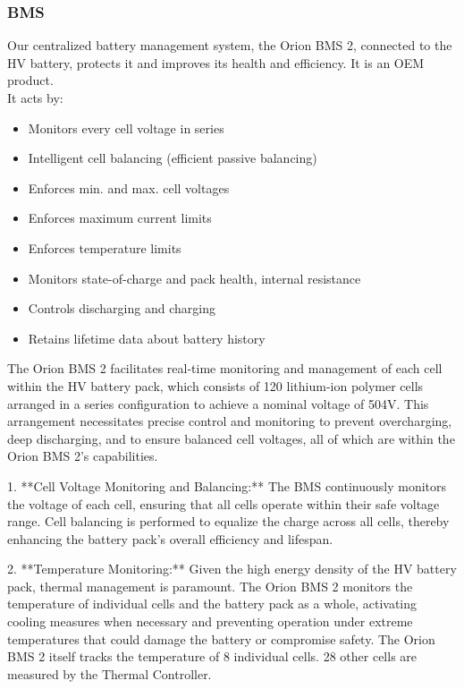 \subsubsection{BMS}
Our centralized battery management system, the Orion BMS 2, connected to the HV battery, protects it and improves its health and efficiency.
It is an OEM product. \\
It acts by: \begin{itemize}
    \item Monitors every cell voltage in series
    \item Intelligent cell balancing (efficient passive
    balancing)
    \item Enforces min. and max. cell voltages
    \item Enforces maximum current limits
    \item Enforces temperature limits
    \item Monitors state-of-charge and pack health, internal resistance
    \item Controls discharging and charging
    \item Retains lifetime data about battery history
\end{itemize}

The Orion BMS 2 facilitates real-time monitoring and management of each cell within the HV battery pack, 
which consists of 120 lithium-ion polymer cells arranged in a series configuration to achieve a nominal voltage of 504V. 
This arrangement necessitates precise control and monitoring to prevent overcharging, deep discharging, and to ensure balanced 
cell voltages, all of which are within the Orion BMS 2's capabilities.

1. **Cell Voltage Monitoring and Balancing:** The BMS continuously monitors the voltage of each cell, ensuring 
that all cells operate within their safe voltage range. Cell balancing is performed to equalize the charge across all cells,
thereby enhancing the battery pack's overall efficiency and lifespan.

2. **Temperature Monitoring:** 
Given the high energy density of the HV battery pack, 
thermal management is paramount. The Orion BMS 2 monitors the temperature of individual cells 
and the battery pack as a whole, activating cooling measures when necessary and preventing operation 
under extreme temperatures that could damage the battery or compromise safety.
The Orion BMS 2 itself tracks the temperature of 8 individual cells. 28 other cells are measured by the Thermal Controller.

